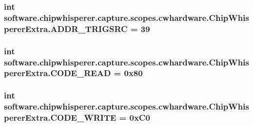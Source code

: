 \subsubsection[{A\+D\+D\+R\+\_\+\+T\+R\+I\+G\+S\+R\+C}]{\setlength{\rightskip}{0pt plus 5cm}int software.\+chipwhisperer.\+capture.\+scopes.\+cwhardware.\+Chip\+Whisperer\+Extra.\+A\+D\+D\+R\+\_\+\+T\+R\+I\+G\+S\+R\+C = 39}\label{namespacesoftware_1_1chipwhisperer_1_1capture_1_1scopes_1_1cwhardware_1_1ChipWhispererExtra_a757c14dd6a4f40e2d53dea57a11e7a8e}
\hypertarget{namespacesoftware_1_1chipwhisperer_1_1capture_1_1scopes_1_1cwhardware_1_1ChipWhispererExtra_aabd9dc49afd2e384a146be7453823299}{}
\subsubsection[{C\+O\+D\+E\+\_\+\+R\+E\+A\+D}]{\setlength{\rightskip}{0pt plus 5cm}int software.\+chipwhisperer.\+capture.\+scopes.\+cwhardware.\+Chip\+Whisperer\+Extra.\+C\+O\+D\+E\+\_\+\+R\+E\+A\+D = 0x80}\label{namespacesoftware_1_1chipwhisperer_1_1capture_1_1scopes_1_1cwhardware_1_1ChipWhispererExtra_aabd9dc49afd2e384a146be7453823299}
\hypertarget{namespacesoftware_1_1chipwhisperer_1_1capture_1_1scopes_1_1cwhardware_1_1ChipWhispererExtra_acdc5099c2322b237b6cb3af1bbaef0a1}{}
\subsubsection[{C\+O\+D\+E\+\_\+\+W\+R\+I\+T\+E}]{\setlength{\rightskip}{0pt plus 5cm}int software.\+chipwhisperer.\+capture.\+scopes.\+cwhardware.\+Chip\+Whisperer\+Extra.\+C\+O\+D\+E\+\_\+\+W\+R\+I\+T\+E = 0x\+C0}\label{namespacesoftware_1_1chipwhisperer_1_1capture_1_1scopes_1_1cwhardware_1_1ChipWhispererExtra_acdc5099c2322b237b6cb3af1bbaef0a1}
